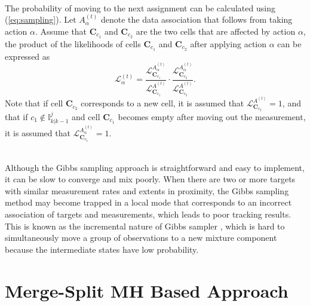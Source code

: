 ~\\
The probability of moving to the next assignment can be calculated using (\ref{eq:sampling}). Let $A_{\alpha}^{(t)}$ denote the data association that follows from taking action $\alpha$. Assume that $\mathbf{C}_{c_1}$ and $\mathbf{C}_{c_2}$ are the two cells that are affected by action $\alpha$, the product of the likelihoods of cells $\mathbf{C}_{c_1}$ and $\mathbf{C}_{c_2}$ after applying action $\alpha$ can be expressed as
\begin{equation}
    \mathcal{L}^{(t)}_{\alpha} = \frac{\mathcal{L}^{A^{(t)}_{\alpha}}_{\mathbf{C}_{c_1}}}{\mathcal{L}^{A^{(t)}}_{\mathbf{C}_{c_1}}}\cdot\frac{\mathcal{L}^{A^{(t)}_{\alpha}}_{\mathbf{C}_{c_2}}}{\mathcal{L}^{A^{(t)}}_{\mathbf{C}_{c_2}}}.
\end{equation}
Note that if cell $\mathbf{C}_{c_2}$ corresponds to a new cell, it is assumed that $\mathcal{L}^{A^{(t)}}_{\mathbf{C}_{c_2}} = 1$, and that if $c_1\notin\mathbb{I}^j_{k|k-1}$ and cell $\mathbf{C}_{c_1}$
becomes empty after moving out the measurement, it is assumed that $\mathcal{L}^{A^{(t)}_{\alpha}}_{\mathbf{C}_{c_1}} = 1$.

~\\
Although the Gibbs sampling approach is straightforward and easy to implement, it can be slow to converge and mix poorly. When there are two or more targets with similar measurement rates and extents in proximity, the Gibbs sampling method may become trapped in a local mode that corresponds to an incorrect association of targets and measurements, which leads to poor tracking results. This is known as the incremental nature of Gibbs sampler \cite{gibbspoor}, which is hard to simultaneously move a group of observations to a new mixture component because the intermediate states have low probability. 


\section{Merge-Split MH Based Approach}